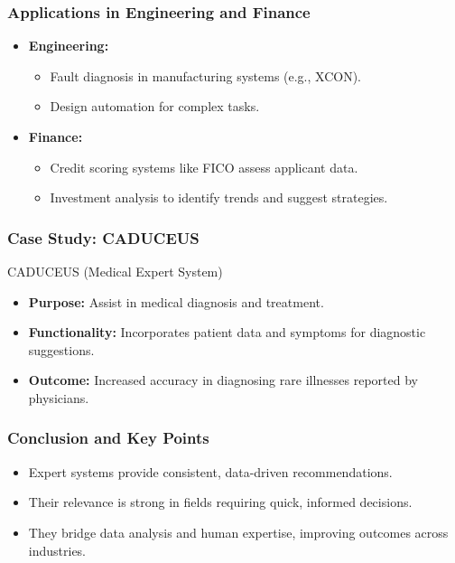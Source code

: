 \documentclass[aspectratio=169]{beamer}
\begin{document}
\begin{frame}[fragile]
    \frametitle{Applications in Engineering and Finance}
    \begin{itemize}
        \item \textbf{Engineering:}
        \begin{itemize}
            \item Fault diagnosis in manufacturing systems (e.g., XCON).
            \item Design automation for complex tasks.
        \end{itemize}
        \item \textbf{Finance:}
        \begin{itemize}
            \item Credit scoring systems like FICO assess applicant data.
            \item Investment analysis to identify trends and suggest strategies.
        \end{itemize}
    \end{itemize}
\end{frame}

\begin{frame}[fragile]
    \frametitle{Case Study: CADUCEUS}
    \begin{block}{CADUCEUS (Medical Expert System)}
        \begin{itemize}
            \item \textbf{Purpose:} Assist in medical diagnosis and treatment.
            \item \textbf{Functionality:} Incorporates patient data and symptoms for diagnostic suggestions.
            \item \textbf{Outcome:} Increased accuracy in diagnosing rare illnesses reported by physicians.
        \end{itemize}
    \end{block}
\end{frame}

\begin{frame}[fragile]
    \frametitle{Conclusion and Key Points}
    \begin{itemize}
        \item Expert systems provide consistent, data-driven recommendations.
        \item Their relevance is strong in fields requiring quick, informed decisions.
        \item They bridge data analysis and human expertise, improving outcomes across industries.
    \end{itemize}
\end{frame}
\end{document}
